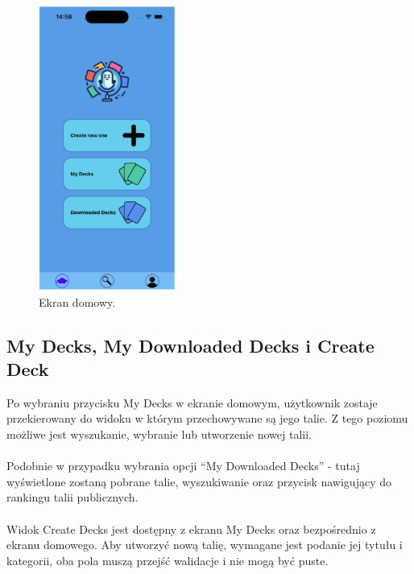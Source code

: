 \begin{figure}[H]
    \centering
    \includegraphics[width=0.4\textwidth]{chapters/chapter_10/images_mobile/mobile_home}
    \caption{Ekran domowy.}
    \label{img:mobile_home}
\end{figure}


\subsection{My Decks, My Downloaded Decks i Create Deck}
Po wybraniu przycisku My Decks w ekranie domowym, użytkownik zostaje przekierowany do widoku w którym przechowywane są jego talie. Z tego poziomu możliwe jest wyszukanie, wybranie lub utworzenie nowej talii. \\\\
Podobnie w przypadku wybrania opcji “My Downloaded Decks” - tutaj wyświetlone zostaną pobrane talie, wyszukiwanie oraz przycisk nawigujący do rankingu talii publicznych. \\\\
Widok Create Decks jest dostępny z ekranu My Decks oraz bezpośrednio z ekranu domowego. Aby utworzyć nową talię, wymagane jest podanie jej tytułu i kategorii, oba pola muszą przejść walidacje i nie mogą być puste.


